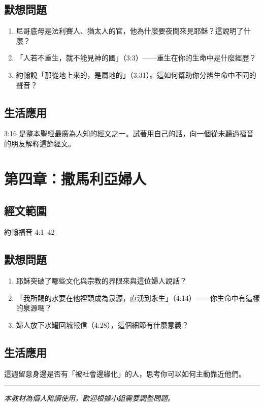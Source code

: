 \documentclass[12pt, a4paper]{article}
\begin{document}
\subsection*{默想問題}
\begin{enumerate}[leftmargin=*, label=\arabic*.]
  \item 尼哥底母是法利賽人、猶太人的官，他為什麼要夜間來見耶穌？這說明了什麼？
  \item 「人若不重生，就不能見神的國」（3:3）——重生在你的生命中是什麼經歷？
  \item 約翰說「那從地上來的，是屬地的」（3:31）。這如何幫助你分辨生命中不同的聲音？
\end{enumerate}

\subsection*{生活應用}
3:16 是整本聖經最廣為人知的經文之一。試著用自己的話，向一個從未聽過福音的朋友解釋這節經文。

\section{第四章：撒馬利亞婦人}

\subsection*{經文範圍}
約翰福音 4:1--42

\subsection*{默想問題}
\begin{enumerate}[leftmargin=*, label=\arabic*.]
  \item 耶穌突破了哪些文化與宗教的界限來與這位婦人說話？
  \item 「我所賜的水要在他裡頭成為泉源，直湧到永生」（4:14）——你生命中有這樣的泉源嗎？
  \item 婦人放下水罐回城報信（4:28），這個細節有什麼意義？
\end{enumerate}

\subsection*{生活應用}
這週留意身邊是否有「被社會邊緣化」的人，思考你可以如何主動靠近他們。

\bigskip
\hrule
\bigskip
\noindent\textit{本教材為個人陪讀使用，歡迎根據小組需要調整問題。}
\end{document}
